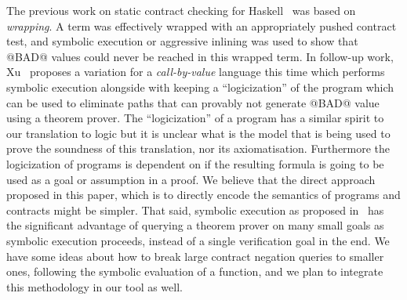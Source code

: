 The previous work on static contract checking for Haskell~\cite{xu+:contracts} 
was based on {\em wrapping}. A term was effectively wrapped
with an appropriately pushed contract test, and symbolic execution or aggressive inlining was used to show that @BAD@ values could
never be reached in this wrapped term. 
In follow-up work, Xu~\cite{Xu:2012:HCC:2103746.2103767} proposes a variation for a 
{\em call-by-value} language this time which performs symbolic execution alongside with
keeping a ``logicization'' of the program which can be used to eliminate paths that can
provably not generate @BAD@ value using a theorem prover. The ``logicization'' of a 
program has a similar spirit to our translation to logic but it is unclear what is the
model that is being used to prove the soundness of this translation, nor its 
axiomatisation. Furthermore the logicization of programs is dependent on if 
the resulting formula is going to be used as a goal or assumption in a proof. We believe
that the direct approach proposed in this paper, which is to directly encode the semantics
of programs and contracts might be simpler. That said, symbolic execution as proposed
in~\cite{Xu:2012:HCC:2103746.2103767} has the significant advantage of querying a 
theorem prover on many small goals as symbolic execution proceeds, instead of a 
single verification goal in the end. We have some ideas about how to break large 
contract negation queries to smaller ones, following the symbolic evaluation of 
a function, and we plan to integrate this methodology in our tool as well.

